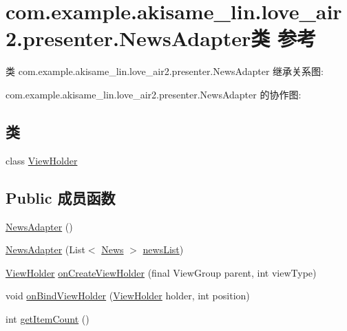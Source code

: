 \hypertarget{classcom_1_1example_1_1akisame__lin_1_1love__air2_1_1presenter_1_1_news_adapter}{}\section{com.\+example.\+akisame\+\_\+lin.\+love\+\_\+air2.\+presenter.\+News\+Adapter类 参考}
\label{classcom_1_1example_1_1akisame__lin_1_1love__air2_1_1presenter_1_1_news_adapter}


类 com.\+example.\+akisame\+\_\+lin.\+love\+\_\+air2.\+presenter.\+News\+Adapter 继承关系图\+:


com.\+example.\+akisame\+\_\+lin.\+love\+\_\+air2.\+presenter.\+News\+Adapter 的协作图\+:
\subsection*{类}
\begin{DoxyCompactItemize}
\item 
class \mbox{\hyperlink{classcom_1_1example_1_1akisame__lin_1_1love__air2_1_1presenter_1_1_news_adapter_1_1_view_holder}{View\+Holder}}
\end{DoxyCompactItemize}
\subsection*{Public 成员函数}
\begin{DoxyCompactItemize}
\item 
\mbox{\hyperlink{classcom_1_1example_1_1akisame__lin_1_1love__air2_1_1presenter_1_1_news_adapter_adadc323da8fae8db23a4af79b5c90de2}{News\+Adapter}} ()
\item 
\mbox{\hyperlink{classcom_1_1example_1_1akisame__lin_1_1love__air2_1_1presenter_1_1_news_adapter_a1b73fa76d94d652385c5c9cf933745f1}{News\+Adapter}} (List$<$ \mbox{\hyperlink{classcom_1_1example_1_1akisame__lin_1_1love__air2_1_1_bean_1_1_news}{News}} $>$ \mbox{\hyperlink{classcom_1_1example_1_1akisame__lin_1_1love__air2_1_1presenter_1_1_news_adapter_a4b3c5fab27de6545bfeba74c4ccb3f53}{news\+List}})
\item 
\mbox{\hyperlink{classcom_1_1example_1_1akisame__lin_1_1love__air2_1_1presenter_1_1_news_adapter_1_1_view_holder}{View\+Holder}} \mbox{\hyperlink{classcom_1_1example_1_1akisame__lin_1_1love__air2_1_1presenter_1_1_news_adapter_a83512d8d81d9e2c76ab31633fa784177}{on\+Create\+View\+Holder}} (final View\+Group parent, int view\+Type)
\item 
void \mbox{\hyperlink{classcom_1_1example_1_1akisame__lin_1_1love__air2_1_1presenter_1_1_news_adapter_a1252c6f7fb07fcd64c6e615a5df47d96}{on\+Bind\+View\+Holder}} (\mbox{\hyperlink{classcom_1_1example_1_1akisame__lin_1_1love__air2_1_1presenter_1_1_news_adapter_1_1_view_holder}{View\+Holder}} holder, int position)
\item 
int \mbox{\hyperlink{classcom_1_1example_1_1akisame__lin_1_1love__air2_1_1presenter_1_1_news_adapter_a10cfd93da1ff0575e46dc86d7c205bb7}{get\+Item\+Count}} ()
\end{DoxyCompactItemize}
